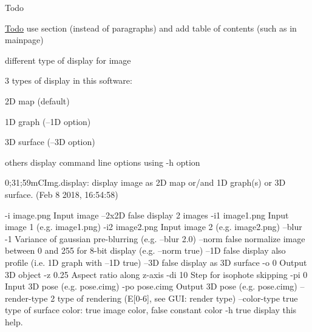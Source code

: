 \begin{DoxyRefDesc}{Todo}
\item[\hyperlink{todo__todo000001}{Todo}]use section (instead of paragraphs) and add table of contents (such as in mainpage)\end{DoxyRefDesc}


\begin{DoxyParagraph}{different type of display for image}

\end{DoxyParagraph}
3 types of display in this software\-: \begin{DoxyItemize}
\item 2\-D map (default) \item 1\-D graph ({\ttfamily --1\-D} option) \item 3\-D surface ({\ttfamily --3\-D} option)\end{DoxyItemize}
others display command line options using {\ttfamily -\/h} option 
\begin{DoxyVerbInclude}

 0;31;59mCImg.display: display image as 2D map or/and 1D graph(s) or 3D surface. (Feb  8 2018, 16:54:58)

    -i               image.png                Input image
    --2x2D           false                    display 2 images
    -i1              image1.png               Input image 1 (e.g. image1.png)
    -i2              image2.png               Input image 2 (e.g. image2.png)
    --blur           -1                       Variance of gaussian pre-blurring (e.g. --blur 2.0)
    --norm           false                    normalize image between 0 and 255 for 8-bit display (e.g. --norm true)
    --1D             false                    display also profile (i.e. 1D graph with --1D true)
    --3D             false                    display as 3D surface
    -o               0                        Output 3D object
    -z               0.25                     Aspect ratio along z-axis
    -di              10                       Step for isophote skipping
    -pi              0                        Input 3D pose  (e.g. pose.cimg)
    -po              pose.cimg                Output 3D pose (e.g. pose.cimg)
    --render-type    2                        type of rendering (E[0-6], see GUI: render type)
    --color-type     true                     type of surface color: true image color, false constant color
    -h               true                     display this help.
\end{DoxyVerbInclude}


